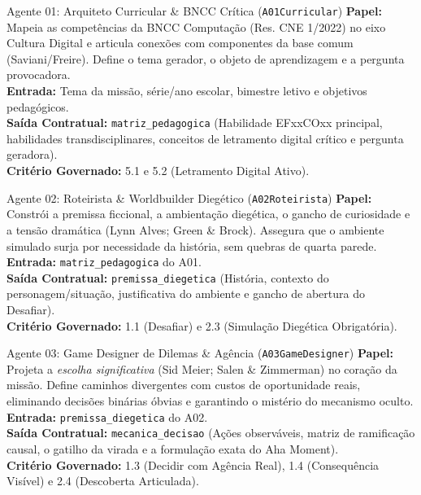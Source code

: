 \documentclass[11pt,a4paper]{article}
\begin{document}
\begin{agentbox}{Agente 01: Arquiteto Curricular \& BNCC Cr\'itica (\texttt{A01Curricular})}
\textbf{Papel:} Mapeia as compet\^encias da BNCC Computa\c{c}\~ao (Res. CNE 1/2022) no eixo Cultura Digital e articula conex\~oes com componentes da base comum (Saviani/Freire). Define o tema gerador, o objeto de aprendizagem e a pergunta provocadora.\\
\textbf{Entrada:} Tema da miss\~ao, s\'erie/ano escolar, bimestre letivo e objetivos pedag\'ogicos.\\
\textbf{Sa\'ida Contratual:} \texttt{matriz\_pedagogica} (Habilidade EFxxCOxx principal, habilidades transdisciplinares, conceitos de letramento digital cr\'itico e pergunta geradora).\\
\textbf{Crit\'erio Governado:} 5.1 e 5.2 (Letramento Digital Ativo).
\end{agentbox}

\begin{agentbox}{Agente 02: Roteirista \& Worldbuilder Dieg\'etico (\texttt{A02Roteirista})}
\textbf{Papel:} Constr\'oi a premissa ficcional, a ambienta\c{c}\~ao dieg\'etica, o gancho de curiosidade e a tens\~ao dram\'atica (Lynn Alves; Green \& Brock). Assegura que o ambiente simulado surja por necessidade da hist\'oria, sem quebras de quarta parede.\\
\textbf{Entrada:} \texttt{matriz\_pedagogica} do A01.\\
\textbf{Sa\'ida Contratual:} \texttt{premissa\_diegetica} (Hist\'oria, contexto do personagem/situa\c{c}\~ao, justificativa do ambiente e gancho de abertura do Desafiar).\\
\textbf{Crit\'erio Governado:} 1.1 (Desafiar) e 2.3 (Simula\c{c}\~ao Dieg\'etica Obrigat\'oria).
\end{agentbox}

\begin{agentbox}{Agente 03: Game Designer de Dilemas \& Ag\^encia (\texttt{A03GameDesigner})}
\textbf{Papel:} Projeta a \emph{escolha significativa} (Sid Meier; Salen \& Zimmerman) no cora\c{c}\~ao da miss\~ao. Define caminhos divergentes com custos de oportunidade reais, eliminando decis\~oes bin\'arias \'obvias e garantindo o mist\'erio do mecanismo oculto.\\
\textbf{Entrada:} \texttt{premissa\_diegetica} do A02.\\
\textbf{Sa\'ida Contratual:} \texttt{mecanica\_decisao} (A\c{c}\~oes observ\'aveis, matriz de ramifica\c{c}\~ao causal, o gatilho da virada e a formula\c{c}\~ao exata do Aha Moment).\\
\textbf{Crit\'erio Governado:} 1.3 (Decidir com Ag\^encia Real), 1.4 (Consequ\^encia Vis\'ivel) e 2.4 (Descoberta Articulada).
\end{agentbox}
\end{document}
